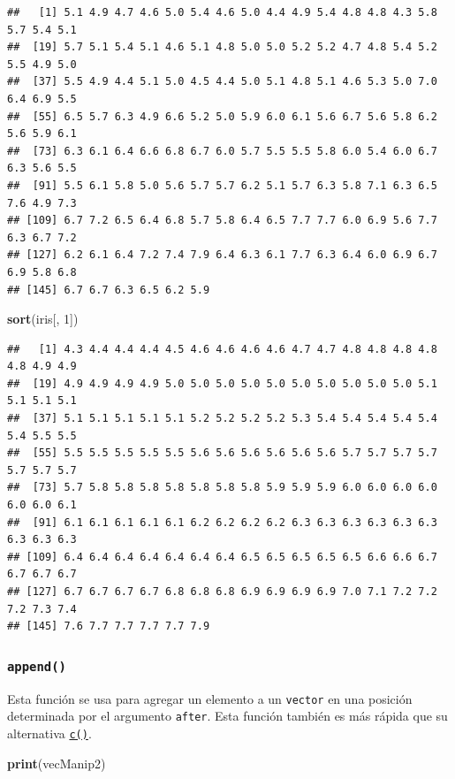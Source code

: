 \documentclass[
]{book}
\newenvironment{Shaded}{\begin{snugshade}}{\end{snugshade}}
\newcommand{\DecValTok}[1]{\textcolor[rgb]{0.00,0.00,0.81}{#1}}
\newcommand{\KeywordTok}[1]{\textcolor[rgb]{0.13,0.29,0.53}{\textbf{#1}}}
\newcommand{\NormalTok}[1]{#1}
\begin{document}
\begin{verbatim}
##   [1] 5.1 4.9 4.7 4.6 5.0 5.4 4.6 5.0 4.4 4.9 5.4 4.8 4.8 4.3 5.8 5.7 5.4 5.1
##  [19] 5.7 5.1 5.4 5.1 4.6 5.1 4.8 5.0 5.0 5.2 5.2 4.7 4.8 5.4 5.2 5.5 4.9 5.0
##  [37] 5.5 4.9 4.4 5.1 5.0 4.5 4.4 5.0 5.1 4.8 5.1 4.6 5.3 5.0 7.0 6.4 6.9 5.5
##  [55] 6.5 5.7 6.3 4.9 6.6 5.2 5.0 5.9 6.0 6.1 5.6 6.7 5.6 5.8 6.2 5.6 5.9 6.1
##  [73] 6.3 6.1 6.4 6.6 6.8 6.7 6.0 5.7 5.5 5.5 5.8 6.0 5.4 6.0 6.7 6.3 5.6 5.5
##  [91] 5.5 6.1 5.8 5.0 5.6 5.7 5.7 6.2 5.1 5.7 6.3 5.8 7.1 6.3 6.5 7.6 4.9 7.3
## [109] 6.7 7.2 6.5 6.4 6.8 5.7 5.8 6.4 6.5 7.7 7.7 6.0 6.9 5.6 7.7 6.3 6.7 7.2
## [127] 6.2 6.1 6.4 7.2 7.4 7.9 6.4 6.3 6.1 7.7 6.3 6.4 6.0 6.9 6.7 6.9 5.8 6.8
## [145] 6.7 6.7 6.3 6.5 6.2 5.9
\end{verbatim}

\begin{Shaded}
\begin{Highlighting}[]
\KeywordTok{sort}\NormalTok{(iris[, }\DecValTok{1}\NormalTok{])}
\end{Highlighting}
\end{Shaded}

\begin{verbatim}
##   [1] 4.3 4.4 4.4 4.4 4.5 4.6 4.6 4.6 4.6 4.7 4.7 4.8 4.8 4.8 4.8 4.8 4.9 4.9
##  [19] 4.9 4.9 4.9 4.9 5.0 5.0 5.0 5.0 5.0 5.0 5.0 5.0 5.0 5.0 5.1 5.1 5.1 5.1
##  [37] 5.1 5.1 5.1 5.1 5.1 5.2 5.2 5.2 5.2 5.3 5.4 5.4 5.4 5.4 5.4 5.4 5.5 5.5
##  [55] 5.5 5.5 5.5 5.5 5.5 5.6 5.6 5.6 5.6 5.6 5.6 5.7 5.7 5.7 5.7 5.7 5.7 5.7
##  [73] 5.7 5.8 5.8 5.8 5.8 5.8 5.8 5.8 5.9 5.9 5.9 6.0 6.0 6.0 6.0 6.0 6.0 6.1
##  [91] 6.1 6.1 6.1 6.1 6.1 6.2 6.2 6.2 6.2 6.3 6.3 6.3 6.3 6.3 6.3 6.3 6.3 6.3
## [109] 6.4 6.4 6.4 6.4 6.4 6.4 6.4 6.5 6.5 6.5 6.5 6.5 6.6 6.6 6.7 6.7 6.7 6.7
## [127] 6.7 6.7 6.7 6.7 6.8 6.8 6.8 6.9 6.9 6.9 6.9 7.0 7.1 7.2 7.2 7.2 7.3 7.4
## [145] 7.6 7.7 7.7 7.7 7.7 7.9
\end{verbatim}

\hypertarget{l015append}{%
\subsubsection{\texorpdfstring{\texttt{append()}}{append()}}\label{l015append}}

Esta función se usa para agregar un elemento a un \texttt{vector} en una posición determinada por el argumento \texttt{after}. Esta función también es más rápida que su alternativa \protect\hyperlink{l014vector}{\texttt{c()}}.

\begin{Shaded}
\begin{Highlighting}[]
\KeywordTok{print}\NormalTok{(vecManip2)}
\end{Highlighting}
\end{Shaded}
\end{document}
